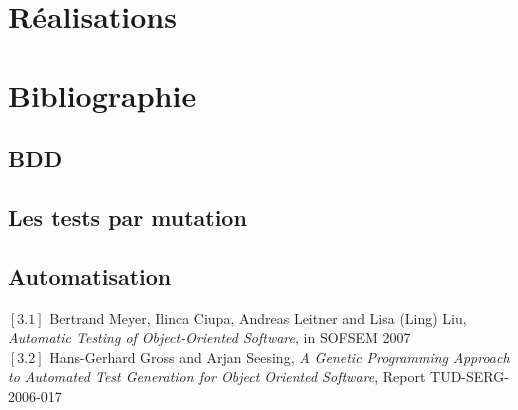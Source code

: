 \documentclass[a4paper]{report}
\begin{document}
\chapter*{Réalisations}


\chapter*{Bibliographie}
\section*{BDD}

\section*{Les tests par mutation}

\section*{Automatisation}

$[3.1]$ Bertrand Meyer, Ilinca Ciupa, Andreas Leitner and Lisa (Ling) Liu, \textit{Automatic Testing of Object-Oriented Software}, in SOFSEM 2007\\
$[3.2]$ Hans-Gerhard Gross and Arjan Seesing, 
\textit{A Genetic Programming Approach to Automated Test Generation for Object Oriented Software}, Report TUD-SERG-2006-017
\end{document}
